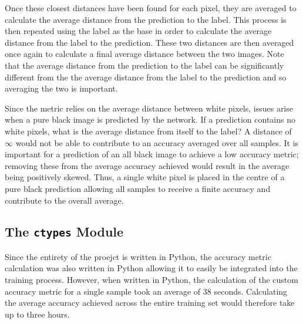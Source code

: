 Once these closest distances have been found for each pixel, they are averaged to calculate the average distance from the prediction to the label. This process is then repeated using the label as the base in order to calculate the average distance from the label to the prediction. These two distances are then averaged once again to calculate a final average distance between the two images. Note that the average distance from the prediction to the label can be significantly different from the the average distance from the label to the prediction and so averaging the two is important.

Since the metric relies on the average distance between white pixels, issues arise when a pure black image is predicted by the network. If a prediction contains no white pixels, what is the average distance from itself to the label? A distance of $\infty$ would not be able to contribute to an accuracy averaged over all samples. It is important for a prediction of an all black image to achieve a low accuracy metric; removing these from the average accuracy achieved would result in the average being positively skewed. Thus, a single white pixel is placed in the centre of a pure black prediction allowing all samples to receive a finite accuracy and contribute to the overall average.


\subsection{The \texttt{ctypes} Module}

Since the entirety of the proejct is written in Python, the accuracy metric calculation was also written in Python allowing it to easily be integrated into the training process. However, when written in Python, the calculation of the custom accuracy metric for a single sample took an average of 38 seconds. Calculating the average accuracy achieved across the entire training set would therefore take up to three hours.

